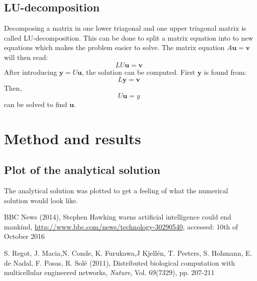 \documentclass[12pt]{article}
\begin{document}
\subsection{LU-decomposition}
Decomposing a matrix in one lower triagonal and one upper triagonal matrix is called LU-decomposition. This can be done to split a matrix equation into to new equations which makes the problem easier to solve. 
The matrix equation $A\mathbf{u}=\mathbf{v}$ will then read:
\begin{equation}
LU\mathbf{u}=\mathbf{v}
\end{equation}
After introducing $\mathbf{y}=U\mathbf{u}$, the solution can be computed. First $\mathbf{y}$ is found from:
\begin{equation}
L\mathbf{y}=\mathbf{v}
\end{equation}
Then, \begin{equation}
U\mathbf{u}=y
\end{equation}
can be solved to find $\mathbf{u}$. 

\section{Method and results}
\subsection{Plot of the analytical solution}
The analytical solution was plotted to get a feeling of what the numerical solution would look like.


























\begin{flushleft}

\begin{thebibliography}{}

\singlespacing
\small


  BBC News (2014),
  Stephen Hawking warns artificial intelligence could end mankind,
  \url{http://www.bbc.com/news/technology-30290540},
  accessed: 10th of October 2016

  
  S. Regot, J. Macia,N. Conde, K. Furukawa,J Kjellén, T. Peeters, S. Hohmann, E. de Nadal, F. Posas, R. Solé (2011),
  Distributed biological computation with multicellular engineered networks,
  \emph{Nature}, Vol. 69(7329), pp. 207-211
  
\end{thebibliography}
\end{flushleft}
\end{document}
